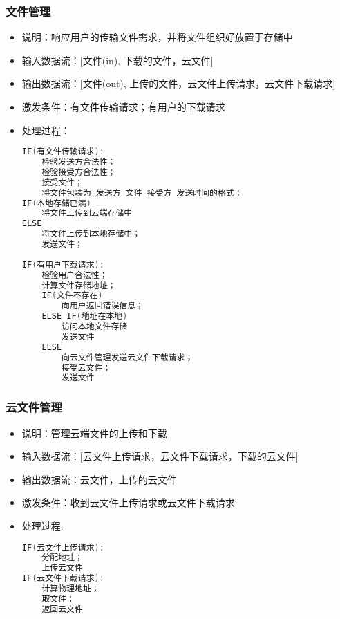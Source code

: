             \subsubsection{文件管理}
            \begin{itemize}
                \item 说明：响应用户的传输文件需求，并将文件组织好放置于存储中
                \item 输入数据流：[文件(in), 下载的文件，云文件]
                \item 输出数据流：[文件(out), 上传的文件，云文件上传请求，云文件下载请求]
                \item 激发条件：有文件传输请求；有用户的下载请求
                \item 处理过程：
\begin{lstlisting}[language=C, caption=文件管理, label={code:first-code}]
IF(有文件传输请求):
    检验发送方合法性；
    检验接受方合法性；
    接受文件；
    将文件包装为 发送方 文件 接受方 发送时间的格式；
IF(本地存储已满) 
    将文件上传到云端存储中
ELSE 
    将文件上传到本地存储中；
    发送文件；
                
IF(有用户下载请求):
    检验用户合法性；
    计算文件存储地址；
    IF(文件不存在) 
        向用户返回错误信息；
    ELSE IF(地址在本地)
        访问本地文件存储
        发送文件
    ELSE 
        向云文件管理发送云文件下载请求；
        接受云文件；
        发送文件
\end{lstlisting}
            \end{itemize}    
            \subsubsection{云文件管理}
            \begin{itemize}
                \item 说明：管理云端文件的上传和下载
                \item 输入数据流：[云文件上传请求，云文件下载请求，下载的云文件]
                \item 输出数据流：云文件，上传的云文件
                \item 激发条件：收到云文件上传请求或云文件下载请求
                \item 处理过程: 
\begin{lstlisting}[language=C, caption=云文件管理, label={code:first-code}]
IF(云文件上传请求):
    分配地址；
    上传云文件
IF(云文件下载请求):
    计算物理地址；
    取文件；
    返回云文件
\end{lstlisting}
            \end{itemize}
